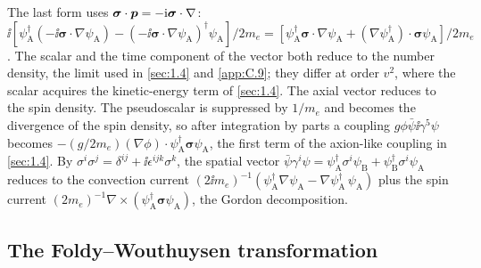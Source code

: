 The last form uses $\boldsymbol{\sigma}\cdot\bm{p} = -\mathrm{i}\boldsymbol{\sigma}\cdot\nabla$: $\ii[\psi_{\mathrm{A}}^\dagger(-\ii\boldsymbol{\sigma}\cdot\nabla\psi_{\mathrm{A}}) - (-\ii\boldsymbol{\sigma}\cdot\nabla\psi_{\mathrm{A}})^\dagger\psi_{\mathrm{A}}]/2m_e = [\psi_{\mathrm{A}}^\dagger\boldsymbol{\sigma}\cdot\nabla\psi_{\mathrm{A}} + (\nabla\psi_{\mathrm{A}}^\dagger)\cdot\boldsymbol{\sigma}\psi_{\mathrm{A}}]/2m_e$. The scalar and the time component of the vector both reduce to the number density, the limit used in \cref{sec:1.4} and \cref{app:C.9}; they differ at order $v^2$, where the scalar acquires the kinetic-energy term of \cref{sec:1.4}. The axial vector reduces to the spin density. The pseudoscalar is suppressed by $1/m_e$ and becomes the divergence of the spin density, so after integration by parts a coupling $g\phi\bar\psi\ii\gamma^5\psi$ becomes $-(g/2m_e)(\nabla\phi)\cdot\psi_{\mathrm{A}}^\dagger\boldsymbol{\sigma}\psi_{\mathrm{A}}$, the first term of the axion-like coupling in \cref{sec:1.4}. By $\sigma^i\sigma^j = \delta^{ij} + \ii\epsilon^{ijk}\sigma^k$, the spatial vector $\bar\psi\gamma^i\psi = \psi_{\mathrm{A}}^\dagger\sigma^i\psi_{\mathrm{B}} + \psi_{\mathrm{B}}^\dagger\sigma^i\psi_{\mathrm{A}}$ reduces to the convection current $(2\ii m_e)^{-1}(\psi_{\mathrm{A}}^\dagger\nabla\psi_{\mathrm{A}} - \nabla\psi_{\mathrm{A}}^\dagger\,\psi_{\mathrm{A}})$ plus the spin current $(2m_e)^{-1}\nabla\times(\psi_{\mathrm{A}}^\dagger\boldsymbol{\sigma}\psi_{\mathrm{A}})$, the Gordon decomposition.

\subsection{The Foldy--Wouthuysen transformation}


